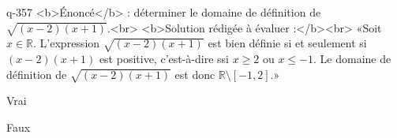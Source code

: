 \begin{truefalse}{q-357}
<b>Énoncé</b> : déterminer le domaine de définition de $\sqrt{(x-2)(x+1)}$.<br> <b>Solution rédigée à évaluer :</b><br>  «Soit $x\in\mathbb{R}$.  L'expression $\sqrt{(x-2)(x+1)}$ est bien définie si et seulement si $(x-2)(x+1)$ est positive, c'est-à-dire ssi $x\geq 2$ ou $x\leq -1$. Le domaine de définition de $\sqrt{(x-2)(x+1)}$ est donc $\mathbb{R}\setminus [-1,2]$.»
\item Vrai
\item* Faux
\end{truefalse}

